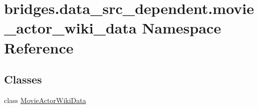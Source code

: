 \hypertarget{namespacebridges_1_1data__src__dependent_1_1movie__actor__wiki__data}{}\section{bridges.\+data\+\_\+src\+\_\+dependent.\+movie\+\_\+actor\+\_\+wiki\+\_\+data Namespace Reference}
\label{namespacebridges_1_1data__src__dependent_1_1movie__actor__wiki__data}
\subsection*{Classes}
\begin{DoxyCompactItemize}
\item 
class \hyperlink{classbridges_1_1data__src__dependent_1_1movie__actor__wiki__data_1_1_movie_actor_wiki_data}{Movie\+Actor\+Wiki\+Data}
\end{DoxyCompactItemize}
